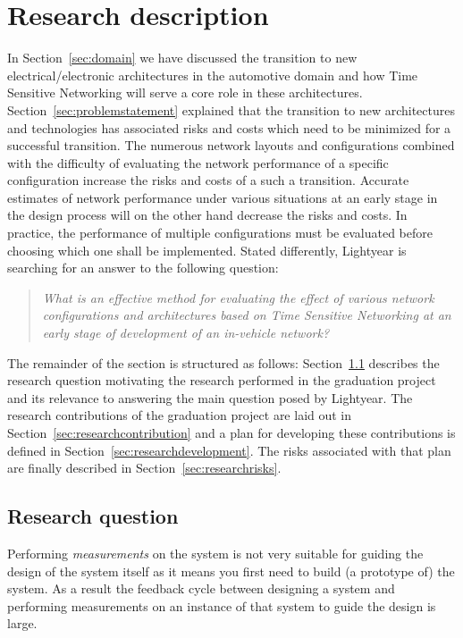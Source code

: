 \section{Research description}
\label{sec:researchdescription}
In Section~\ref{sec:domain} we have discussed the transition to new electrical/electronic architectures in the automotive domain and how Time Sensitive Networking will serve a core role in these architectures. Section~\ref{sec:problemstatement} explained that the transition to new architectures and technologies has associated risks and costs which need to be minimized for a successful transition. 
The numerous network layouts and configurations combined with the difficulty of evaluating the network performance of a specific configuration increase the risks and costs of a such a transition. Accurate estimates of network performance under various situations at an early stage in the design process will on the other hand decrease the risks and costs. In practice, the performance of multiple configurations must be evaluated before choosing which one shall be implemented. Stated differently, Lightyear is searching for an answer to the following question:

\begin{quote}
    \emph{What is an effective method for evaluating the effect of various network configurations and architectures based on Time Sensitive Networking at an early stage of development of an in-vehicle network?}
\end{quote}

The remainder of the section is structured as follows: Section~\ref{sec:researchquestion} describes the research question motivating the research performed in the graduation project and its relevance to answering the main question posed by Lightyear. The research contributions of the graduation project are laid out in Section~\ref{sec:researchcontribution} and a plan for developing these contributions is defined in Section~\ref{sec:researchdevelopment}. The risks associated with that plan are finally described in Section~\ref{sec:researchrisks}.

\subsection{Research question}
\label{sec:researchquestion}
Performing \textit{measurements} on the system is not very suitable for guiding the design of the system itself as it means you first need to build (a prototype of) the system. As a result the feedback cycle between designing a system and performing measurements on an instance of that system to guide the design is large. 

